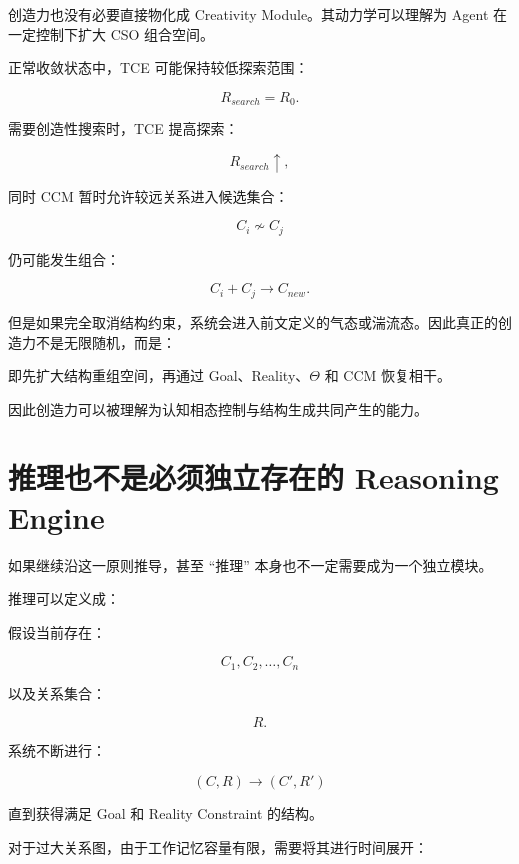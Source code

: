 创造力也没有必要直接物化成 Creativity Module。其动力学可以理解为 Agent 在一定控制下扩大 CSO 组合空间。

正常收敛状态中，TCE 可能保持较低探索范围：

\[
R_{search}=R_0.
\]

需要创造性搜索时，TCE 提高探索：

\[
R_{search}\uparrow,
\]

同时 CCM 暂时允许较远关系进入候选集合：

\[
C_i
\not\sim
C_j
\]

仍可能发生组合：

\[
C_i+C_j
\rightarrow
C_{new}.
\]

但是如果完全取消结构约束，系统会进入前文定义的气态或湍流态。因此真正的创造力不是无限随机，而是：

\begin{statementbox}
\centering
{}
\end{statementbox}

即先扩大结构重组空间，再通过 Goal、Reality、$\Theta$ 和 CCM 恢复相干。

因此创造力可以被理解为认知相态控制与结构生成共同产生的能力。

\section{推理也不是必须独立存在的 Reasoning Engine}

如果继续沿这一原则推导，甚至 ``推理'' 本身也不一定需要成为一个独立模块。

推理可以定义成：

\begin{statementbox}
\centering
{}
\end{statementbox}

假设当前存在：

\[
C_1,C_2,\ldots,C_n
\]

以及关系集合：

\[
R.
\]

系统不断进行：

\[
(C,R)
\rightarrow
(C',R')
\]

直到获得满足 Goal 和 Reality Constraint 的结构。

对于过大关系图，由于工作记忆容量有限，需要将其进行时间展开：

